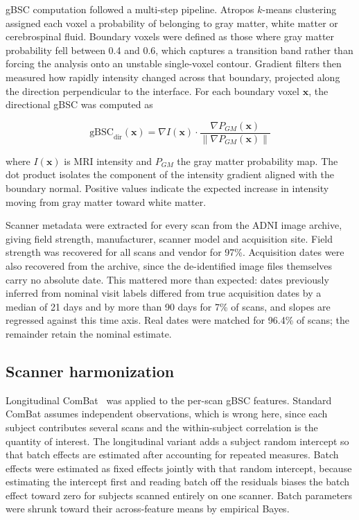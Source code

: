 \documentclass[blue]{ludusofficial}  %
\begin{document}
gBSC computation followed a multi-step pipeline. Atropos $k$-means clustering~\cite{avants2011atropos} assigned each voxel a probability of belonging to gray matter, white matter or cerebrospinal fluid. Boundary voxels were defined as those where gray matter probability fell between 0.4 and 0.6, which captures a transition band rather than forcing the analysis onto an unstable single-voxel contour. Gradient filters then measured how rapidly intensity changed across that boundary, projected along the direction perpendicular to the interface. For each boundary voxel $\mathbf{x}$, the directional gBSC was computed as

\begin{equation}
    \text{gBSC}_{\text{dir}}(\mathbf{x}) = \nabla I(\mathbf{x}) \cdot \frac{\nabla P_{GM}(\mathbf{x})}{\|\nabla P_{GM}(\mathbf{x})\|}
\end{equation}

where $I(\mathbf{x})$ is MRI intensity and $P_{GM}$ the gray matter probability map. The dot product isolates the component of the intensity gradient aligned with the boundary normal. Positive values indicate the expected increase in intensity moving from gray matter toward white matter.

Scanner metadata were extracted for every scan from the ADNI image archive, giving field strength, manufacturer, scanner model and acquisition site. Field strength was recovered for all scans and vendor for 97\%. Acquisition dates were also recovered from the archive, since the de-identified image files themselves carry no absolute date. This mattered more than expected: dates previously inferred from nominal visit labels differed from true acquisition dates by a median of 21 days and by more than 90 days for 7\% of scans, and slopes are regressed against this time axis. Real dates were matched for 96.4\% of scans; the remainder retain the nominal estimate.

\subsection{Scanner harmonization}

Longitudinal ComBat~\cite{beer2020longitudinal} was applied to the per-scan gBSC features. Standard ComBat assumes independent observations, which is wrong here, since each subject contributes several scans and the within-subject correlation is the quantity of interest. The longitudinal variant adds a subject random intercept so that batch effects are estimated after accounting for repeated measures. Batch effects were estimated as fixed effects jointly with that random intercept, because estimating the intercept first and reading batch off the residuals biases the batch effect toward zero for subjects scanned entirely on one scanner. Batch parameters were shrunk toward their across-feature means by empirical Bayes.
\end{document}

